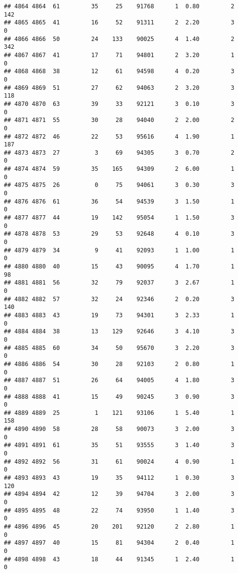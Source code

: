 \documentclass[
]{article}
\begin{document}
\begin{verbatim}
## 4864 4864  61         35     25    91768      1  0.80         2      142
## 4865 4865  41         16     52    91311      2  2.20         3        0
## 4866 4866  50         24    133    90025      4  1.40         2      342
## 4867 4867  41         17     71    94801      2  3.20         1        0
## 4868 4868  38         12     61    94598      4  0.20         3        0
## 4869 4869  51         27     62    94063      2  3.20         3      118
## 4870 4870  63         39     33    92121      3  0.10         3        0
## 4871 4871  55         30     28    94040      2  2.00         2        0
## 4872 4872  46         22     53    95616      4  1.90         1      187
## 4873 4873  27          3     69    94305      3  0.70         2        0
## 4874 4874  59         35    165    94309      2  6.00         1        0
## 4875 4875  26          0     75    94061      3  0.30         3        0
## 4876 4876  61         36     54    94539      3  1.50         1        0
## 4877 4877  44         19    142    95054      1  1.50         3        0
## 4878 4878  53         29     53    92648      4  0.10         3        0
## 4879 4879  34          9     41    92093      1  1.00         1        0
## 4880 4880  40         15     43    90095      4  1.70         1       98
## 4881 4881  56         32     79    92037      3  2.67         1        0
## 4882 4882  57         32     24    92346      2  0.20         3      140
## 4883 4883  43         19     73    94301      3  2.33         1        0
## 4884 4884  38         13    129    92646      3  4.10         3        0
## 4885 4885  60         34     50    95670      3  2.20         3        0
## 4886 4886  54         30     28    92103      2  0.80         1        0
## 4887 4887  51         26     64    94005      4  1.80         3        0
## 4888 4888  41         15     49    90245      3  0.90         3        0
## 4889 4889  25          1    121    93106      1  5.40         1      158
## 4890 4890  58         28     58    90073      3  2.00         3        0
## 4891 4891  61         35     51    93555      3  1.40         3        0
## 4892 4892  56         31     61    90024      4  0.90         1        0
## 4893 4893  43         19     35    94112      1  0.30         3      120
## 4894 4894  42         12     39    94704      3  2.00         3        0
## 4895 4895  48         22     74    93950      1  1.40         3        0
## 4896 4896  45         20    201    92120      2  2.80         1        0
## 4897 4897  40         15     81    94304      2  0.40         1        0
## 4898 4898  43         18     44    91345      1  2.40         1        0

\end{verbatim}
\end{document}
